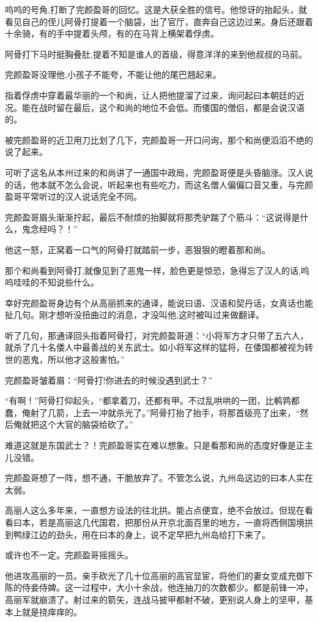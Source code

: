 呜呜的号角,打断了完颜盈哥的回忆。这是大获全胜的信号。他惊讶的抬起头，就看见自己的侄儿阿骨打提着一个脑袋，出了官厅，直奔自己这边过来。身后还跟着十余骑，有的手中提着头颅，有的在马背上横架着俘虏。

阿骨打下马时挺胸叠肚,提着不知是谁人的首级，得意洋洋的来到他叔叔的马前。

完颜盈哥没理他,小孩子不能夸，不能让他的尾巴翘起来。

指着俘虏中穿着最华丽的一个和尚，让人把他提溜了过来，询问起曰本朝廷的近况。能在战时留在最后，这个和尚的地位不会低。而倭国的僧侣，都是会说汉语的。

被完颜盈哥的近卫用刀比划了几下，完颜盈哥一开口问询，那个和尚便滔滔不绝的说了起来。

可听了这名从本州过来的和尚讲了一通国中政局，完颜盈哥便是头昏脑涨。汉人说的话，他本就不怎么会说，听起来也有些吃力，而这名僧人偏偏口音又重，与完颜盈哥平常听过的汉人说话完全不同。

完颜盈哥眉头渐渐拧起，最后不耐烦的抬脚就将那秃驴踹了个筋斗：“这说得是什么，鬼念经吗？！”

他这一怒，正窝着一口气的阿骨打就踏前一步，恶狠狠的瞪着那和尚。

那个和尚看到阿骨打,就像见到了恶鬼一样，脸色更是惊恐，急得忘了汉人的话,呜呜哇哇的不知说些什么。

幸好完颜盈哥身边有个从高丽抓来的通译，能说曰语、汉语和契丹话，女真话也能扯几句。刚才想听没扭曲过的消息，才没叫他,这时被叫过来做翻译。

听了几句，那通译回头指着阿骨打，对完颜盈哥道：“小将军方才只带了五六人，就杀了几十名倭人中最善战的关东武士。如小将军这样的猛将，在倭国都被视为转世的恶鬼，所以他才这般害怕。”

完颜盈哥皱着眉：“阿骨打!你进去的时候没遇到武士？”

“有啊！”阿骨打仰起头，“都拿着刀，还都有甲。不过乱哄哄的一团，比鹌鹑都蠢，俺射了几箭，上去一冲就杀光了。”阿骨打抬了抬手，将那首级亮了出来，“然后俺就把这个大官的脑袋给砍了。”

难道这就是东国武士？！完颜盈哥实在难以想象。只是看那和尚的态度好像是正主儿没错。

完颜盈哥想了一阵，想不通，干脆放弃了。不管怎么说，九州岛这边的曰本人实在太弱。

高丽人这么多年来，一直想方设法的往北拱。能占点便宜，绝不会放过。但现在看看曰本，若是高丽这几代国君，把那份从开京北面百里的地方，一直将西侧国境拱到鸭绿江边的劲头，用在曰本的身上，说不定早把九州岛给打下来了。

或许也不一定。完颜盈哥摇摇头。

他进攻高丽的一员。亲手砍光了几十位高丽的高官显宦，将他们的妻女变成充御下陈的侍妾侍婢。这一过程中，大小十余战，他连抽刀的次数都少。都是前锋一冲，高丽军就崩溃了。射过来的箭矢，连战马披甲都射不破，更别说人身上的坚甲，基本上就是挠痒痒的。

